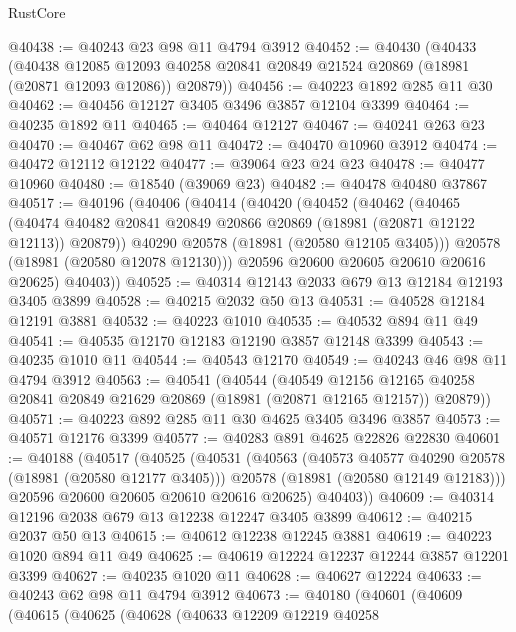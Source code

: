 \begin{lexlean}{RustCore}
\begin{coremodule}
@40438 := @40243 @23 @98 @11 @4794 @3912
@40452 := @40430
    (@40433
      (@40438
        @12085
        @12093
        @40258
        @20841
        @20849
        @21524
        @20869
        (@18981 (@20871 @12093 @12086))
        @20879))
@40456 := @40223 @1892 @285 @11 @30
@40462 := @40456 @12127 @3405 @3496 @3857 @12104 @3399
@40464 := @40235 @1892 @11
@40465 := @40464 @12127
@40467 := @40241 @263 @23
@40470 := @40467 @62 @98 @11
@40472 := @40470 @10960 @3912
@40474 := @40472 @12112 @12122
@40477 := @39064 @23 @24 @23
@40478 := @40477 @10960
@40480 := @18540 (@39069 @23)
@40482 := @40478 @40480 @37867
@40517 := @40196
    (@40406
      (@40414
        (@40420
          (@40452
            (@40462
              (@40465
                (@40474 @40482 @20841 @20849 @20866 @20869 (@18981 (@20871 @12122 @12113)) @20879))
              @40290
              @20578
              (@18981 (@20580 @12105 @3405)))
            @20578
            (@18981 (@20580 @12078 @12130)))
          @20596
          @20600
          @20605
          @20610
          @20616
          @20625)
        @40403))
@40525 := @40314 @12143 @2033 @679 @13 @12184 @12193 @3405 @3899
@40528 := @40215 @2032 @50 @13
@40531 := @40528 @12184 @12191 @3881
@40532 := @40223 @1010
@40535 := @40532 @894 @11 @49
@40541 := @40535 @12170 @12183 @12190 @3857 @12148 @3399
@40543 := @40235 @1010 @11
@40544 := @40543 @12170
@40549 := @40243 @46 @98 @11 @4794 @3912
@40563 := @40541
    (@40544
      (@40549
        @12156
        @12165
        @40258
        @20841
        @20849
        @21629
        @20869
        (@18981 (@20871 @12165 @12157))
        @20879))
@40571 := @40223 @892 @285 @11 @30 @4625 @3405 @3496 @3857
@40573 := @40571 @12176 @3399
@40577 := @40283 @891 @4625 @22826 @22830
@40601 := @40188
    (@40517
      (@40525
        (@40531
          (@40563
            (@40573 @40577 @40290 @20578 (@18981 (@20580 @12177 @3405)))
            @20578
            (@18981 (@20580 @12149 @12183)))
          @20596
          @20600
          @20605
          @20610
          @20616
          @20625)
        @40403))
@40609 := @40314 @12196 @2038 @679 @13 @12238 @12247 @3405 @3899
@40612 := @40215 @2037 @50 @13
@40615 := @40612 @12238 @12245 @3881
@40619 := @40223 @1020 @894 @11 @49
@40625 := @40619 @12224 @12237 @12244 @3857 @12201 @3399
@40627 := @40235 @1020 @11
@40628 := @40627 @12224
@40633 := @40243 @62 @98 @11 @4794 @3912
@40673 := @40180
    (@40601
      (@40609
        (@40615
          (@40625
            (@40628
              (@40633
                @12209
                @12219
                @40258

\end{coremodule}
\end{lexlean}
